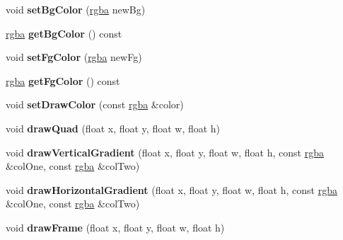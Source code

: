 \begin{DoxyCompactItemize}
\item 
\hypertarget{class_c_gui_panel_a6b8b932df857e5f867ee0c4571f7c98c}{
void {\bfseries setBgColor} (\hyperlink{classrgba}{rgba} newBg)}
\label{class_c_gui_panel_a6b8b932df857e5f867ee0c4571f7c98c}

\item 
\hypertarget{class_c_gui_panel_a2853f62bf5fc2bdd947505b99bed9ff0}{
\hyperlink{classrgba}{rgba} {\bfseries getBgColor} () const }
\label{class_c_gui_panel_a2853f62bf5fc2bdd947505b99bed9ff0}

\item 
\hypertarget{class_c_gui_panel_adc4029bc7db20aebd2a7d0b604de7fac}{
void {\bfseries setFgColor} (\hyperlink{classrgba}{rgba} newFg)}
\label{class_c_gui_panel_adc4029bc7db20aebd2a7d0b604de7fac}

\item 
\hypertarget{class_c_gui_panel_a3b43efb863acb70f3160968990f26a55}{
\hyperlink{classrgba}{rgba} {\bfseries getFgColor} () const }
\label{class_c_gui_panel_a3b43efb863acb70f3160968990f26a55}

\item 
\hypertarget{class_c_gui_panel_ab61b8fbd2c098f78c53ca97f5f0fb016}{
void {\bfseries setDrawColor} (const \hyperlink{classrgba}{rgba} \&color)}
\label{class_c_gui_panel_ab61b8fbd2c098f78c53ca97f5f0fb016}

\item 
\hypertarget{class_c_gui_panel_a984502f3842bc694ac87d97bd790feca}{
void {\bfseries drawQuad} (float x, float y, float w, float h)}
\label{class_c_gui_panel_a984502f3842bc694ac87d97bd790feca}

\item 
\hypertarget{class_c_gui_panel_a07329837a0533a45a808065a98e7cc85}{
void {\bfseries drawVerticalGradient} (float x, float y, float w, float h, const \hyperlink{classrgba}{rgba} \&colOne, const \hyperlink{classrgba}{rgba} \&colTwo)}
\label{class_c_gui_panel_a07329837a0533a45a808065a98e7cc85}

\item 
\hypertarget{class_c_gui_panel_a9b858ddff6e62c3430c2ba6c4f0a2e5d}{
void {\bfseries drawHorizontalGradient} (float x, float y, float w, float h, const \hyperlink{classrgba}{rgba} \&colOne, const \hyperlink{classrgba}{rgba} \&colTwo)}
\label{class_c_gui_panel_a9b858ddff6e62c3430c2ba6c4f0a2e5d}

\item 
\hypertarget{class_c_gui_panel_ab2b2a82c282fba915b1aeb8e8e815cdf}{
void {\bfseries drawFrame} (float x, float y, float w, float h)}
\label{class_c_gui_panel_ab2b2a82c282fba915b1aeb8e8e815cdf}

\end{DoxyCompactItemize}
